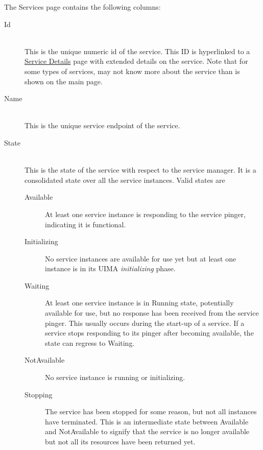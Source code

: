         The Services page contains the following columns: 
        \begin{description}

            \item[Id] \hfill \\
              This is the unique numeric {\DUCC} id of the service.  This ID is hyperlinked to a
              \hyperref[sec:ws-service-details]{Service Details} page with extended
              details on the service.  Note that for some types of services, {\DUCC} may not
              know more about the service than is shown on the main page.

            \item[Name] \hfill \\
              This is the unique service endpoint of the service.  
              
            \item[State] \hfill \\
              This is the state of the service with respect to the service manager.  It is a
              consolidated state over all the service instances.  Valid states are
              \begin{description}
                \item[Available] At least one service instance is responding to the service
                  pinger, indicating it is functional.
                \item[Initializing] No service instances are available for use yet but at least one instance
                  is in its UIMA {\em initializing} phase.
                \item[Waiting] At least one service instance is in Running state, potentially available for use,
                  but no response has been received from the service pinger.  This usually occurs during the
                  start-up of a service.  If a service stops responding to its pinger after becoming
                  available, the state can regress to Waiting.
                \item[NotAvailable] No service instance is running or initializing. 
                \item[Stopping] The service has been stopped for some reason, but not all 
                  instances have terminated.  This is an intermediate state between Available and
                  NotAvailable to signify that the service is no longer available but not all its
                  resources have been returned yet.
              \end{description}


\end{description}
